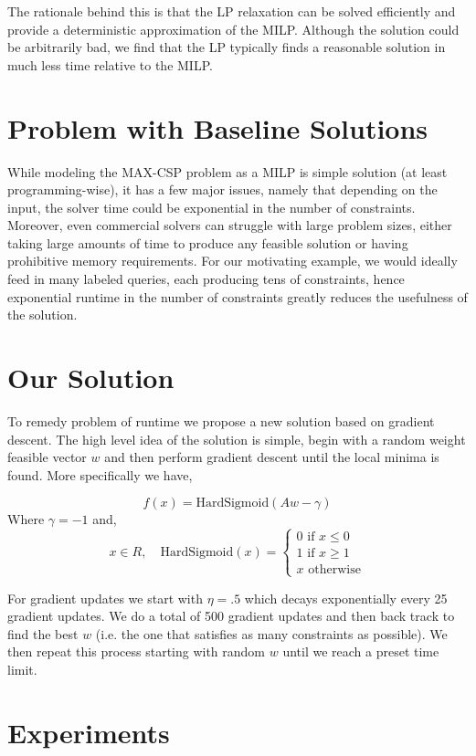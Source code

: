 \documentclass[a4paper]{article}
\begin{document}
The rationale behind this is that the LP relaxation can be solved efficiently and provide a 
deterministic approximation of the MILP. Although the solution could be arbitrarily bad,
we find that the LP typically finds a reasonable solution in much less time 
relative to the MILP. 

\section{Problem with Baseline Solutions}

While modeling the MAX-CSP problem as a MILP is simple solution (at least programming-wise), 
it has a few major issues, namely that depending on the input, the solver time could be exponential in 
the number of constraints. Moreover, even commercial solvers can struggle with large problem sizes, 
either taking large amounts of time to produce any feasible solution or having prohibitive memory requirements.
For our motivating example, we would ideally feed in many labeled queries, 
each producing tens of constraints, hence exponential runtime in the number of constraints greatly 
reduces the usefulness of the solution. 


\section{Our Solution}

To remedy problem of runtime we propose a new solution based on gradient descent. The high level
idea of the solution is simple, begin with a random weight feasible vector $w$ and then perform 
gradient descent until the local minima is found. More specifically we have, 

$$
f(x) = \text{HardSigmoid}(Aw - \gamma)
$$
Where $ \gamma = -1$ and, 
$$
x\in R, \quad \text{HardSigmoid}(x) = \begin{cases} 0 \text{ if } x \leq 0\\ 1 \text{ if } x \geq 1\\ x \text{ otherwise}\end{cases}
$$

For gradient updates we start with $\eta = .5$ which decays exponentially every 25 gradient updates. We do a total 
of 500 gradient updates and then back track to find the best $w$ (i.e. the one that satisfies as many constraints as 
possible). We then repeat this process starting with random $w$ until we reach a preset time limit.

\section{Experiments}
\end{document}
